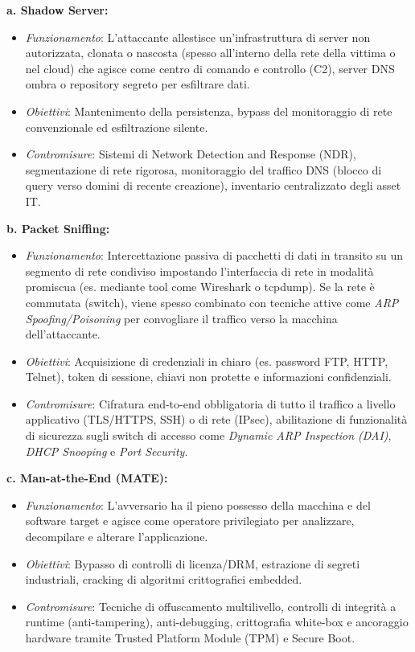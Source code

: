 \documentclass[11pt,a4paper]{article}
\begin{document}
\begin{solutionbox}
\textbf{a. Shadow Server:}
\begin{itemize}
    \item \textit{Funzionamento}: L'attaccante allestisce un'infrastruttura di server non autorizzata, clonata o nascosta (spesso all'interno della rete della vittima o nel cloud) che agisce come centro di comando e controllo (C2), server DNS ombra o repository segreto per esfiltrare dati.
    \item \textit{Obiettivi}: Mantenimento della persistenza, bypass del monitoraggio di rete convenzionale ed esfiltrazione silente.
    \item \textit{Contromisure}: Sistemi di Network Detection and Response (NDR), segmentazione di rete rigorosa, monitoraggio del traffico DNS (blocco di query verso domini di recente creazione), inventario centralizzato degli asset IT.
\end{itemize}

\textbf{b. Packet Sniffing:}
\begin{itemize}
    \item \textit{Funzionamento}: Intercettazione passiva di pacchetti di dati in transito su un segmento di rete condiviso impostando l'interfaccia di rete in modalit\`a promiscua (es. mediante tool come Wireshark o tcpdump). Se la rete \`e commutata (switch), viene spesso combinato con tecniche attive come \textit{ARP Spoofing/Poisoning} per convogliare il traffico verso la macchina dell'attaccante.
    \item \textit{Obiettivi}: Acquisizione di credenziali in chiaro (es. password FTP, HTTP, Telnet), token di sessione, chiavi non protette e informazioni confidenziali.
    \item \textit{Contromisure}: Cifratura end-to-end obbligatoria di tutto il traffico a livello applicativo (TLS/HTTPS, SSH) o di rete (IPsec), abilitazione di funzionalit\`a di sicurezza sugli switch di accesso come \textit{Dynamic ARP Inspection (DAI)}, \textit{DHCP Snooping} e \textit{Port Security}.
\end{itemize}

\textbf{c. Man-at-the-End (MATE):}
\begin{itemize}
    \item \textit{Funzionamento}: L'avversario ha il pieno possesso della macchina e del software target e agisce come operatore privilegiato per analizzare, decompilare e alterare l'applicazione.
    \item \textit{Obiettivi}: Bypasso di controlli di licenza/DRM, estrazione di segreti industriali, cracking di algoritmi crittografici embedded.
    \item \textit{Contromisure}: Tecniche di offuscamento multilivello, controlli di integrit\`a a runtime (anti-tampering), anti-debugging, crittografia white-box e ancoraggio hardware tramite Trusted Platform Module (TPM) e Secure Boot.
\end{itemize}


\end{solutionbox}
\end{document}
